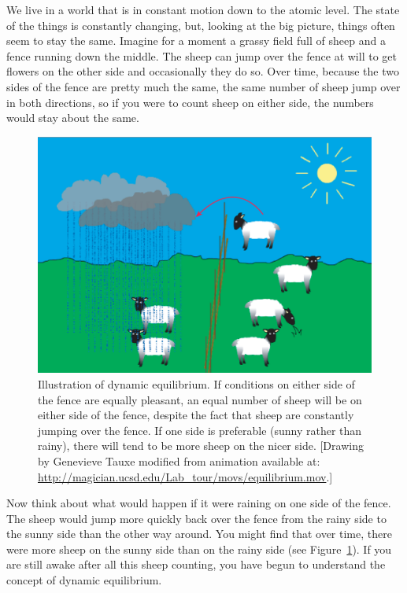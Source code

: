 We live in a world that is  in constant motion  down to the atomic level. The state of the things is constantly changing, but, looking at the big picture, things often seem to stay the same.  Imagine for a moment a grassy field full of sheep and  a fence running down the middle.  The sheep can jump over the fence at will to get flowers on the other side and occasionally they do so.   Over time, because the two sides of the fence  are pretty much the same, the same number of sheep jump over in both directions, so if you were to count sheep on either side, the numbers would stay about the same.



\begin{figure}[htb]
\centering  \includegraphics[width=10 cm]{EPSfiles/equilibrium.eps}
\caption{Illustration of dynamic equilibrium.  If conditions on either side of the fence are equally pleasant, an equal number of sheep will be on either side of the fence, despite the fact that sheep are constantly jumping over the fence.  If one side is preferable (sunny rather than rainy), there will tend to be more sheep on the nicer side.  [Drawing by Genevieve Tauxe modified from animation  available at: \newline \url{http://magician.ucsd.edu/Lab_tour/movs/equilibrium.mov}.]}
\label{fig:equilibrium}
\end{figure}

Now think about what would happen if it were raining on one side of the fence.   The sheep would jump more quickly back over the fence from the rainy side to the sunny side than the other way around. You might find that over time, there were more sheep on the sunny side than on the rainy side (see Figure~\ref{fig:equilibrium}).   If you are still awake after all this sheep counting, you have begun to understand the concept of dynamic equilibrium.



